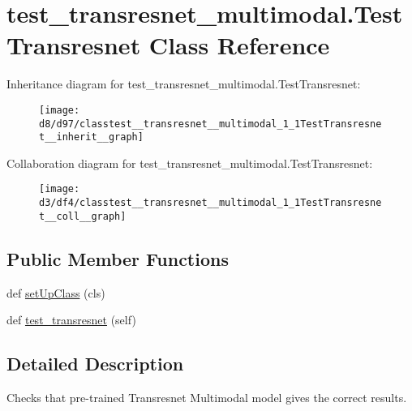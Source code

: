 \hypertarget{classtest__transresnet__multimodal_1_1TestTransresnet}{}\section{test\+\_\+transresnet\+\_\+multimodal.\+Test\+Transresnet Class Reference}
\label{classtest__transresnet__multimodal_1_1TestTransresnet}


Inheritance diagram for test\+\_\+transresnet\+\_\+multimodal.\+Test\+Transresnet\+:\nopagebreak
\begin{figure}[H]
\begin{center}
\leavevmode
\texttt{[image: d8/d97/classtest\_\_transresnet\_\_multimodal\_1\_1TestTransresnet\_\_inherit\_\_graph]}
\end{center}
\end{figure}


Collaboration diagram for test\+\_\+transresnet\+\_\+multimodal.\+Test\+Transresnet\+:\nopagebreak
\begin{figure}[H]
\begin{center}
\leavevmode
\texttt{[image: d3/df4/classtest\_\_transresnet\_\_multimodal\_1\_1TestTransresnet\_\_coll\_\_graph]}
\end{center}
\end{figure}
\subsection*{Public Member Functions}
\begin{DoxyCompactItemize}
\item 
def \hyperlink{classtest__transresnet__multimodal_1_1TestTransresnet_ac013f711d027118f9d5db92c63659a80}{set\+Up\+Class} (cls)
\item 
def \hyperlink{classtest__transresnet__multimodal_1_1TestTransresnet_a812e5b711af8dfc4edd18dd4862928d5}{test\+\_\+transresnet} (self)
\end{DoxyCompactItemize}


\subsection{Detailed Description}
\begin{DoxyVerb}Checks that pre-trained Transresnet Multimodal model gives the correct results.
\end{DoxyVerb}
 

